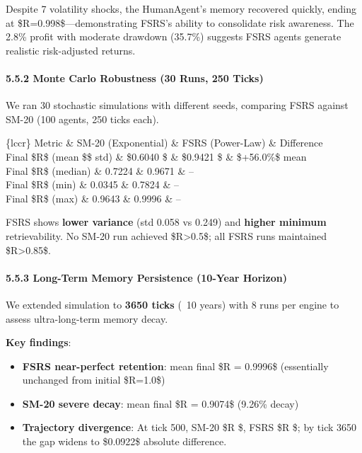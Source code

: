 \documentclass[11pt]{article}
\begin{document}
{{Despite 7 volatility shocks, the HumanAgent's memory recovered quickly, ending at \$R=0.998\$---demonstrating FSRS's ability to consolidate risk awareness. The 2.8\% profit with moderate drawdown (35.7\%) suggests FSRS agents generate realistic risk-adjusted returns.

\paragraph{5.5.2 Monte Carlo Robustness (30 Runs, 250 Ticks)}

We ran 30 stochastic simulations with different seeds, comparing FSRS against SM-20 (100 agents, 250 ticks each).

\begin{table}[htbp]
\centering
\caption{Monte Carlo results: FSRS vs SM-20 over 30 runs (250 ticks). FSRS shows higher mean retrievability with 4× lower variance.}
\label{tab:mc_comparison}
\begin{tabular}\{lccr\}
\toprule
Metric \& SM-20 (Exponential) \& FSRS (Power-Law) \& Difference \\
\midrule
Final \$R\$ (mean \$\pm\$ std) \& \$0.6040 \$ \& \$0.9421 \$ \& \$+56.0\%\$ mean \\
Final \$R\$ (median) \& 0.7224 \& 0.9671 \& -- \\
Final \$R\$ (min) \& 0.0345 \& 0.7824 \& -- \\
Final \$R\$ (max) \& 0.9643 \& 0.9996 \& -- \\
\bottomrule
\end{tabular}
\end{table}

FSRS shows \textbf{lower variance} (std 0.058 vs 0.249) and \textbf{higher minimum} retrievability. No SM-20 run achieved \$R>0.5\$; all FSRS runs maintained \$R>0.85\$.

\paragraph{5.5.3 Long-Term Memory Persistence (10-Year Horizon)}

We extended simulation to \textbf{3650 ticks} (~10 years) with 8 runs per engine to assess ultra-long-term memory decay.

\textbf{Key findings}:

\begin{itemize}
  \item \textbf{FSRS near-perfect retention}: mean final \$R = 0.9996\$ (essentially unchanged from initial \$R=1.0\$)
  \item \textbf{SM-20 severe decay}: mean final \$R = 0.9074\$ (9.26\% decay)
  \item \textbf{Trajectory divergence}: At tick 500, SM-20 \$R \$, FSRS \$R \$; by tick 3650 the gap widens to \$0.0922\$ absolute difference.
\end{itemize}

}}
\end{document}
